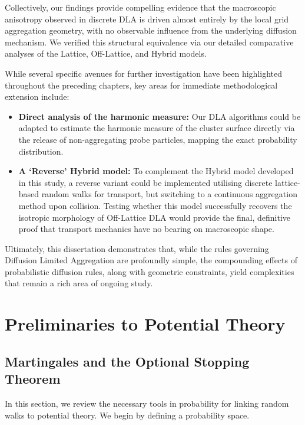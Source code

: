 \documentclass[12pt, a4paper, oneside]{report}
\theoremstyle{remark}
\begin{document}
Collectively, our findings provide compelling evidence that the macroscopic anisotropy observed in discrete DLA is driven almost entirely by the local grid aggregation geometry, with no observable influence from the underlying diffusion mechanism. We verified this structural equivalence via our detailed comparative analyses of the Lattice, Off-Lattice, and Hybrid models.

While several specific avenues for further investigation have been highlighted throughout the preceding chapters, key areas for immediate methodological extension include:
\begin{itemize}
    \item \textbf{Direct analysis of the harmonic measure:} Our DLA algorithms could be adapted to estimate the harmonic measure of the cluster surface directly via the release of non-aggregating probe particles, mapping the exact probability distribution.
    \item \textbf{A `Reverse' Hybrid model:} To complement the Hybrid model developed in this study, a reverse variant could be implemented utilising discrete lattice-based random walks for transport, but switching to a continuous aggregation method upon collision. Testing whether this model successfully recovers the isotropic morphology of Off-Lattice DLA would provide the final, definitive proof that transport mechanics have no bearing on macroscopic shape.

\end{itemize}

\vspace{0.5em}
Ultimately, this dissertation demonstrates that, while the rules governing Diffusion Limited Aggregation are profoundly simple, the compounding effects of probabilistic diffusion rules, along with geometric constraints, yield complexities that remain a rich area of ongoing study. 





\appendix

\chapter{Preliminaries to Potential Theory}
\label{app:preliminaries}

\section{Martingales and the Optional Stopping Theorem}
In this section, we review the necessary tools in probability for linking random walks to potential theory. We begin by defining a probability space.
\end{document}
